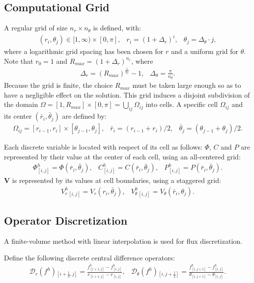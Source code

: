 \documentclass[10pt]{ijnam}
\newcommand{\pars}[1]{\left(#1\right)}
\newcommand{\half}{\frac{1}{2}}
\newcommand\bV{\boldsymbol{V}}
\newcommand\cD{\mathcal{D}}
\begin{document}
\subsection{Computational Grid}
A regular grid of size $n_r \times n_\theta$ is defined, with:
\begin{eqnarray*}
(r_i,\theta_j) \in [1, \infty) \times [0,\pi], & 
r_i = (1+\Delta_r)^i, &
 \theta_j = \Delta_\theta \cdot j,
\end{eqnarray*}
where a logarithmic grid spacing has been chosen for $r$ and a uniform grid for $\theta$.
Note that $r_0 = 1$ and $R_{max} = (1+\Delta_r)^{n_r}$, where
\begin{eqnarray*}
\Delta_r = \pars{R_{max}} ^ \frac{1}{n_r} - 1 ,& \Delta_\theta = \frac{\pi}{n_\theta}.
\end{eqnarray*}
Because the grid is finite, the choice 
$R_{max}$ must be taken large enough so as to have a negligible effect
on the solution.
This grid induces a disjoint subdivision of the domain 
$\Omega = [1, R_{max}] \times [0,\pi] = \bigcup_{ij}\Omega_{ij}$ into cells.
A specific cell $\Omega_{ij}$ and its center $(\bar{r}_i, \bar{\theta}_j)$ are defined by:
\begin{eqnarray*}
\Omega_{ij} = [r_{i-1}, r_{i}] \times [\theta_{j-1}, \theta_{j}], &
\bar{r}_i = (r_{i-1} + r_{i})/2, &
\bar{\theta}_j = (\theta_{j-1} + \theta_{j})/2.
\end{eqnarray*}

Each discrete variable is located with respect of its cell as follows:
$\varPhi$, $C$ and $P$ are represented by their value at the center of each cell, 
using an all-centered grid:
\begin{eqnarray*}
\varPhi^h_{[i,j]} = \varPhi(\bar{r}_i, \bar{\theta}_j), &
C^h_{[i,j]} = C(\bar{r}_i, \bar{\theta}_j), &
P^h_{[i,j]} = P(\bar{r}_i, \bar{\theta}_j).
\end{eqnarray*}
$\bV$ is represented by its values at cell boundaries, using a staggered grid:
\begin{eqnarray*}
V_r^h{}_{[i,j]} = V_r(r_i, \bar{\theta}_j), &
V_\theta^h{}_{[i,j]} = V_\theta(\bar{r}_i, {\theta}_j).
\end{eqnarray*}

\subsection{Operator Discretization} 
A finite-volume method with linear interpolation is used for flux discretization. 

Define the following discrete central difference operators:
\begin{eqnarray*}
\cD_r(f^h){}_{\left[i+\half,j\right]} = \frac{f^h_{\left[i+1,j\right]} - f^h_{\left[i,j\right]}}
                       {r_{\left[i+1,j\right]} - r_{\left[i,j\right]}}, &
\cD_\theta(f^h){}_{\left[i,j+\half\right]} = \frac{f^h_{\left[i,j+1\right]} - f^h_{\left[i,j\right]}}
					   {\theta_{\left[i,j+1\right]} - \theta_{\left[i,j\right]}}.
\end{eqnarray*}
\end{document}
